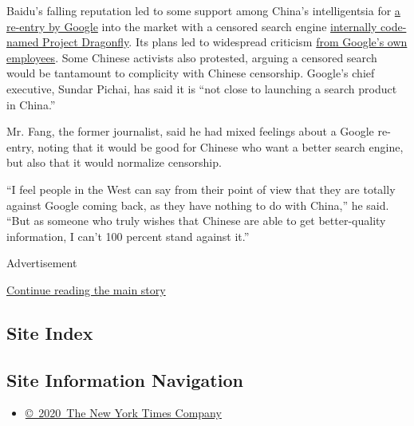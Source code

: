 Baidu's falling reputation led to some support among China's
intelligentsia for
\href{https://www.nytimes.com/2018/08/22/technology/google-china-conventionality.html}{a
re-entry by Google} into the market with a censored search engine
\href{https://www.nytimes.com/2018/08/01/technology/china-google-censored-search-engine.html}{internally
code-named Project Dragonfly}. Its plans led to widespread criticism
\href{https://www.nytimes.com/2018/08/16/technology/google-employees-protest-search-censored-china.html}{from
Google's own employees}. Some Chinese activists also protested, arguing
a censored search would be tantamount to complicity with Chinese
censorship. Google's chief executive, Sundar Pichai, has said it is
``not close to launching a search product in China.''

Mr. Fang, the former journalist, said he had mixed feelings about a
Google re-entry, noting that it would be good for Chinese who want a
better search engine, but also that it would normalize censorship.

``I feel people in the West can say from their point of view that they
are totally against Google coming back, as they have nothing to do with
China,'' he said. ``But as someone who truly wishes that Chinese are
able to get better-quality information, I can't 100 percent stand
against it.''

Advertisement

\protect\hyperlink{after-bottom}{Continue reading the main story}

\hypertarget{site-index}{%
\subsection{Site Index}\label{site-index}}

\hypertarget{site-information-navigation}{%
\subsection{Site Information
Navigation}\label{site-information-navigation}}

\begin{itemize}
\tightlist
\item
  \href{https://help.nytimes.com/hc/en-us/articles/115014792127-Copyright-notice}{©~2020~The
  New York Times Company}
\end{itemize}

